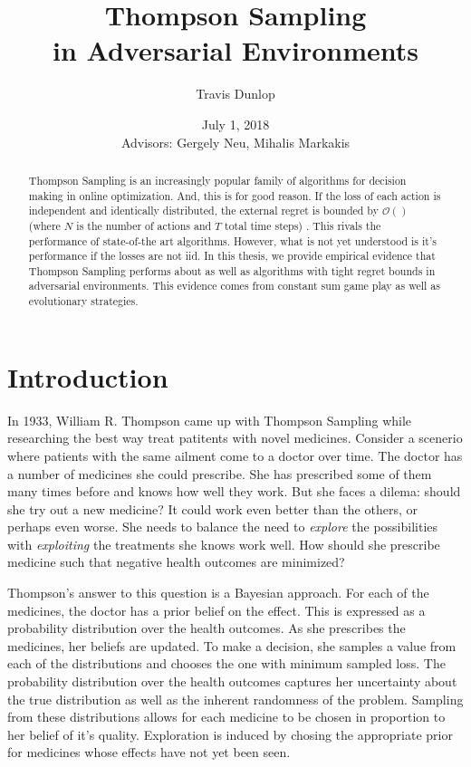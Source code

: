 \documentclass[10pt,a4paper]{article} %
\begin{document}
	\pagestyle{plain}
	\title{\rmfamily\normalfont Thompson Sampling \\in Adversarial Environments}
	\author{Travis Dunlop }
	\date{July 1, 2018\\ $\,$ 
			 \\Advisors: Gergely Neu, Mihalis Markakis} 
	
	\maketitle
	
	\begin{abstract}
		Thompson Sampling is an increasingly popular family of algorithms for decision making in online optimization.  And, this is for good reason.  If the loss of each action is independent and identically distributed, the external regret is bounded by $\mathcal{O}()$ (where $N$ is the number of actions and $T$ total time steps) \cite{agrawal}. This rivals the performance of state-of-the art algorithms.  However, what is not yet understood is it's performance if the losses are not iid.  In this thesis, we provide empirical evidence that Thompson Sampling performs about as well as algorithms with tight regret bounds in adversarial environments.  This evidence comes from constant sum game play as well as evolutionary strategies.
	\end{abstract}
	
	\section{Introduction}
	
	In 1933, William R. Thompson came up with Thompson Sampling \cite{original_gangster} while researching the best way treat patitents with novel medicines.  Consider a scenerio where patients with the same ailment come to a doctor over time.  The doctor has a number of medicines she could prescribe.  She has prescribed some of them many times before and knows how well they work.  But she faces a dilema: should she try out a new medicine? It could work even better than the others, or perhaps even worse.  She needs to balance the need to \textit{explore} the possibilities with \textit{exploiting} the treatments she knows work well.  How should she prescribe medicine such that negative health outcomes are minimized?
	
	Thompson's answer to this question is a Bayesian approach.  For each of the medicines, the doctor has a prior belief on the effect.  This is expressed as a probability distribution over the health outcomes.  As she prescribes the medicines, her beliefs are updated.  To make a decision, she samples a value from each of the distributions and chooses the one with minimum sampled loss.  The probability distribution over the health outcomes captures her uncertainty about the true distribution as well as the inherent randomness of the problem.  Sampling from these distributions allows for each medicine to be chosen in proportion to her belief of it's quality.  Exploration is induced by chosing the appropriate prior for medicines whose effects have not yet been seen.
	
\end{document}
